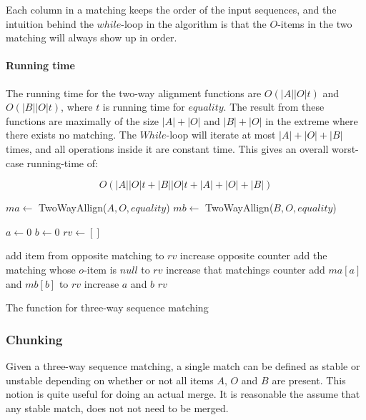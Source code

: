 \documentclass[11pt]{article}
\begin{document}
Each column in a matching keeps the order of the input sequences, and the intuition behind the $while$-loop in the algorithm is that the $O$-items in the two matching will always show up in order.

\paragraph{Running time} The running time for the two-way alignment functions are $O(|A||O|t)$ and $O(|B||O|t)$, where $t$ is running time for $equality$. The result from these functions are maximally of the size $|A|+|O|$ and $|B|+|O|$ in the extreme where there exists no matching. The $While$-loop will iterate at most $|A|+|O|+|B|$ times, and all operations inside it are constant time. This gives an overall worst-case running-time of:

\begin{equation}
	O(|A||O| t + |B||O| t + |A|+|O|+|B| ) \nonumber
\end{equation}  

\begin{algorithm}
\begin{algorithmic}
	\State $ma\gets$ TwoWayAllign($A, O, equality$)
	\State $mb\gets$ TwoWayAllign($B, O, equality$)
	
	\State $a \gets 0$
	\State $b \gets 0$
	\State $rv \gets []$
	
			\State add item from opposite matching to $rv$
			\State increase opposite counter
			\State add the matching whose $o$-item is $null$ to $rv$
			\State increase that matchings counter
		\Else
			\State add $ma[a]$ and $mb[b]$ to $rv$
			\State increase $a$ and $b$
		\EndIf
	\EndWhile
	\State \Return $rv$
	
\EndFunction
\end{algorithmic}
\caption{The function for three-way sequence matching}
  \label{ThreeWayMatchingAlgorithm}
\end{algorithm}

\subsubsection{Chunking}
Given a three-way sequence matching, a single match can be defined as stable or unstable depending on whether or not all items $A$, $O$ and $B$ are present. This notion is quite useful for doing an actual merge. It is reasonable the assume that any stable match, does not not need to be merged.
\end{document}
